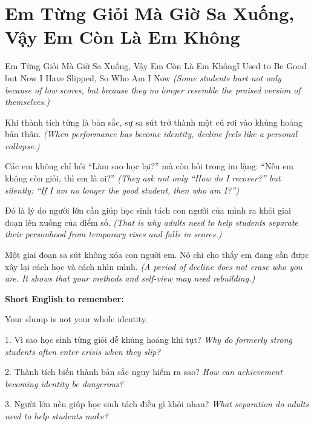 \section{Em Từng Giỏi Mà Giờ Sa Xuống, Vậy Em Còn Là Em Không}
\begin{truyen}{Em Từng Giỏi Mà Giờ Sa Xuống, Vậy Em Còn Là Em Không}{I Used to Be Good but Now I Have Slipped, So Who Am I Now}
\textit{(Some students hurt not only because of low scores, but because they no longer resemble the praised version of themselves.)}

Khi thành tích từng là bản sắc, sự sa sút trở thành một cú rơi vào khủng hoảng bản thân.
\textit{(When performance has become identity, decline feels like a personal collapse.)}

Các em không chỉ hỏi “Làm sao học lại?” mà còn hỏi trong im lặng: “Nếu em không còn giỏi, thì em là ai?”
\textit{(They ask not only “How do I recover?” but silently: “If I am no longer the good student, then who am I?”)}

Đó là lý do người lớn cần giúp học sinh tách con người của mình ra khỏi giai đoạn lên xuống của điểm số.
\textit{(That is why adults need to help students separate their personhood from temporary rises and falls in scores.)}
\end{truyen}

\begin{baihoc}
Một giai đoạn sa sút không xóa con người em. Nó chỉ cho thấy em đang cần được xây lại cách học và cách nhìn mình.
\textit{(A period of decline does not erase who you are. It shows that your methods and self-view may need rebuilding.)}
\end{baihoc}

\begin{ghinhoanh}
\textbf{Short English to remember:}

Your slump is not your whole identity.

\end{ghinhoanh}

\begin{tuhocnhanh}
1. Vì sao học sinh từng giỏi dễ khủng hoảng khi tụt? \textit{Why do formerly strong students often enter crisis when they slip?}

2. Thành tích biến thành bản sắc nguy hiểm ra sao? \textit{How can achievement becoming identity be dangerous?}

3. Người lớn nên giúp học sinh tách điều gì khỏi nhau? \textit{What separation do adults need to help students make?}
\end{tuhocnhanh}
\ngancach

